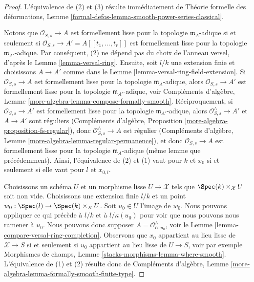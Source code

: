 \begin{proof}
L'équivalence de (2) et (3) résulte immédiatement de
Théorie formelle des déformations, Lemme
\ref{formal-defos-lemma-smooth-power-series-classical}.

\medskip\noindent
Notons que $\mathcal{O}_{S, s} \to A$ est formellement lisse pour la
topologie $\mathfrak m_A$-adique si et seulement si
$\mathcal{O}_{S, s} \to A' = A[[t_1, \ldots, t_r]]$
est formellement lisse pour la topologie $\mathfrak m_{A'}$-adique.
Par conséquent, (2) ne dépend pas du choix
de l'anneau versel, d'après le Lemme \ref{lemma-versal-ring}.
Ensuite, soit $l/k$ une extension finie et choisissons
$A \to A'$ comme dans le Lemme \ref{lemma-versal-ring-field-extension}.
Si $\mathcal{O}_{S, s} \to A$ est formellement lisse pour la
topologie $\mathfrak m_A$-adique, alors $\mathcal{O}_{S, s} \to A'$
est formellement lisse pour la topologie $\mathfrak m_{A'}$-adique, voir
Compléments d'algèbre, Lemme \ref{more-algebra-lemma-compose-formally-smooth}.
Réciproquement, si $\mathcal{O}_{S, s} \to A'$
est formellement lisse pour la topologie $\mathfrak m_{A'}$-adique,
alors $\mathcal{O}_{S, s}^\wedge \to A'$ et $A \to A'$ sont réguliers
(Compléments d'algèbre, Proposition \ref{more-algebra-proposition-fs-regular}),
donc $\mathcal{O}_{S, s}^\wedge \to A$ est régulier
(Compléments d'algèbre, Lemme \ref{more-algebra-lemma-regular-permanence}),
et donc $\mathcal{O}_{S, s} \to A$ est formellement lisse pour la
topologie $\mathfrak m_A$-adique (même lemme que précédemment).
Ainsi, l'équivalence de (2) et (1) vaut pour
$k$ et $x_0$ si et seulement si elle vaut pour $l$ et $x_{0, l}$.

\medskip\noindent
Choisissons un schéma $U$ et un morphisme lisse $U \to \mathcal{X}$ tels
que $\Spec(k) \times_\mathcal{X} U$ soit non vide. Choisissons une extension
finie $l/k$ et un point $w_0 : \Spec(l) \to \Spec(k) \times_\mathcal{X} U$.
Soit $u_0 \in U$ l'image de $w_0$.
Nous pouvons appliquer ce qui précède à $l/k$ et à $l/\kappa(u_0)$
pour voir que nous pouvons nous ramener à $u_0$. Nous pouvons donc supposer
$A = \mathcal{O}_{U, u_0}^\wedge$, voir le
Lemme \ref{lemma-compare-versal-ring-completion}.
Observons que $x_0$ appartient au lieu lisse de $\mathcal{X} \to S$
si et seulement si $u_0$ appartient au lieu lisse de $U \to S$, voir par exemple
Morphismes de champs, Lemme \ref{stacks-morphisms-lemma-where-smooth}.
L'équivalence de (1) et (2) résulte donc de
Compléments d'algèbre, Lemme \ref{more-algebra-lemma-formally-smooth-finite-type}.
\end{proof}

